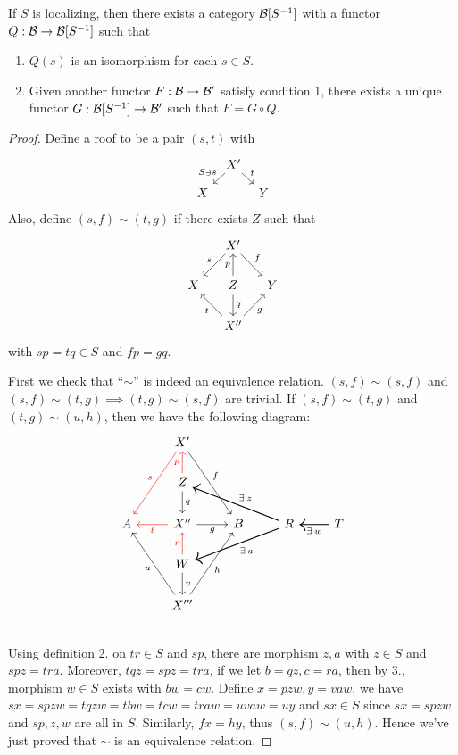 \begin{theorem}
  If $S$ is localizing, then there exists a category $\mathcal{B}[S^{-1}]$ with
  a functor $Q : \mathcal{B} \to \mathcal{B}[S^{-1}]$ such that
  \begin{enumerate}
    \item $Q(s)$ is an isomorphism for each $s \in S$.
    \item Given another functor $F : \mathcal{B} \to \mathcal{B}'$ satisfy condition 1, there exists
      a unique functor $G : \mathcal{B}[S^{-1}] \to \mathcal{B}'$ such that $F = G \circ Q$.
  \end{enumerate}
  \begin{proof}
    Define a roof to be a pair $(s, t)$ with
    \[ \begin{tikzcd}[column sep=tiny, row sep=small]
        & X' \ar[ld, "S \ni s"'] \ar[rd, "t"] & \\
      X & & Y
    \end{tikzcd} \]
  Also, define $(s, f) \sim (t, g)$ if there exists $Z$ such that
  \[ \begin{tikzcd}[column sep=small]
        & X' \ar[ld, "s"'] \ar[rd, "f"] & \\
        X & Z \ar[u, "p"] \ar[d, "q"] & Y \\
        & X'' \ar[lu, "t"] \ar[ru, "g"']  &
    \end{tikzcd} \]
  with $sp = tq \in S$ and $fp = gq$.

  First we check that ``$\sim$'' is indeed an equivalence relation.
  $(s, f) \sim (s, f)$ and $(s, f) \sim (t, g) \implies (t, g) \sim (s, f)$
  are trivial. If $(s, f) \sim (t, g)$ and $(t, g) \sim (u, h)$, then
  we have the following diagram:
  \[
    \begin{tikzcd}
      & X' \ar[ldd, "s"', red] \ar[rdd, "f"] & & & \\
      & Z \ar[u, "p", red] \ar[d, "q"] & & & \\
      A & X'' \ar[l, "t", red] \ar[r, "g"'] & B &
      R \ar[llu, "\exists z"', thick] \ar[lld, "\exists a", thick] & T \ar[l, "\exists w", thick] \\
      & W \ar[u, "r", red] \ar[d, "v"] & & & \\
      & X''' \ar[luu, "u"] \ar[ruu, "h"'] & & & \\
    \end{tikzcd}
  \]
  Using definition 2. on $tr \in S$ and $sp$, there are morphism $z, a$
  with $z \in S$ and $spz = tra$. Moreover, $tqz = spz = tra$,
  if we let $b = qz, c = ra$, then by 3., morphism $w \in S$ exists
  with $bw = cw$. Define $x = pzw, y = vaw$,
  we have $sx = spzw = tqzw = tbw = tcw = traw = uvaw = uy$
  and $sx \in S$ since $sx = spzw$ and $sp, z, w$ are all in $S$.
  Similarly, $fx = hy$, thus $(s, f) \sim (u, h)$.
  Hence we've just proved that $\sim$ is an equivalence relation.


\end{proof}
\end{theorem}
